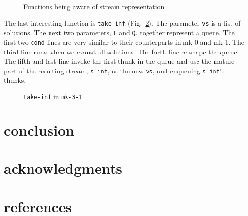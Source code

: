 \documentclass[format=acmlarge, review=true, authordraft=true]{acmart}
\begin{document}
\begin{figure}
	 	
	 \caption{Functions being aware of stream representation}
	 \label{interface}
\end{figure}


The last interesting function is \texttt{take-inf} (Fig.~\ref{take-inf-3-1}). 
The parameter \texttt{vs} is a list of solutions. The next two parameters, 
\texttt{P} and \texttt{Q}, together represent a queue. The first two 
\texttt{cond} lines are very similar to their counterparts in mk-0 and mk-1. 
The third line runs when we exaust all solutions. The forth line re-shape the 
queue. The fifth and last line invoke the first thunk in the queue and use the 
mature part of the resulting stream, \texttt{s-inf}, as the new \texttt{vs}, 
and enqueuing \texttt{s-inf}'s thunks.

\begin{figure}
	 	
	 \caption{\texttt{take-inf} in \texttt{mk-3-1}}
	 \label{take-inf-3-1}
\end{figure}



\section{conclusion}

\section*{acknowledgments}

\section*{references}
\end{document}
